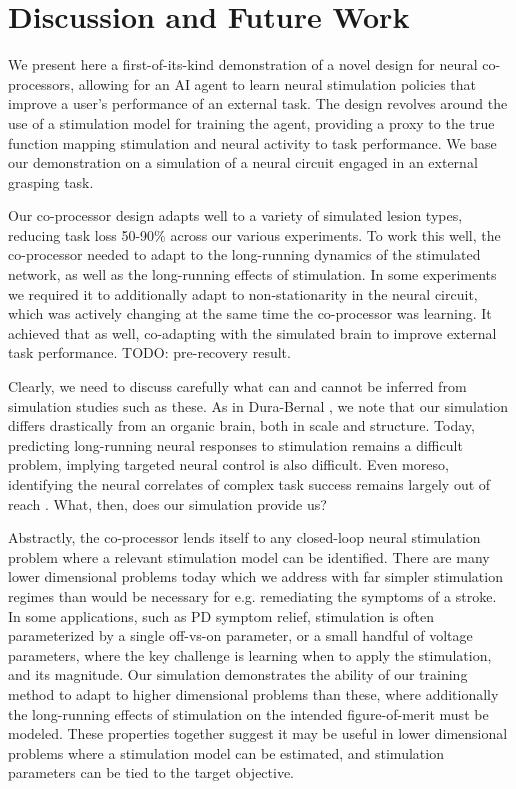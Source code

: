 \documentclass[12pt]{iopart}
\begin{document}
\section{Discussion and Future Work}
\label{sec:discussion}

We present here a first-of-its-kind demonstration of a novel design for neural co-processors,
allowing for an AI agent to learn neural stimulation policies that improve a user's performance
of an external task. The design revolves around the use of a stimulation model for training the
agent, providing a proxy to the true function mapping stimulation and neural activity
to task performance. We base our demonstration on a simulation of a neural circuit engaged in
an external grasping task.

Our co-processor design adapts well to a variety of simulated lesion types, reducing task loss
50-90\% across our various experiments. To work this well, the co-processor needed to adapt to
the long-running dynamics of the stimulated network, as well as the long-running effects of
stimulation. In some experiments we required it to additionally adapt to non-stationarity in
the neural circuit, which was actively changing at the same time the co-processor was learning.
It achieved that as well, co-adapting with the simulated brain to improve external task
performance.  TODO: pre-recovery result.

Clearly, we need to discuss carefully what can and cannot be inferred from simulation studies
such as these. As in Dura-Bernal \cite{bernal.sim}, we note that our simulation differs
drastically from an organic brain, both in scale and structure. Today, predicting long-running
neural responses to stimulation remains a difficult problem, implying targeted neural control
is also difficult. Even moreso, identifying the neural correlates of complex task success
remains largely out of reach \cite{khanna.openloop}. What, then, does our simulation provide us?

Abstractly, the co-processor lends itself to any closed-loop neural stimulation problem
where a relevant stimulation model can be identified. There are many lower dimensional problems
today which we address with far simpler stimulation regimes than would be necessary for
e.g. remediating the symptoms of a stroke. In some applications, such as PD symptom relief,
stimulation is often parameterized by a single off-vs-on parameter, or a small handful of
voltage parameters, where the key challenge is learning when to apply the stimulation, and
its magnitude. Our simulation demonstrates the ability of our training method to adapt to
higher dimensional problems than these, where additionally the long-running effects of
stimulation on the intended figure-of-merit must be modeled. These properties together
suggest it may be useful in lower dimensional problems where a stimulation model can be
estimated, and stimulation parameters can be tied to the target objective.
\end{document}

